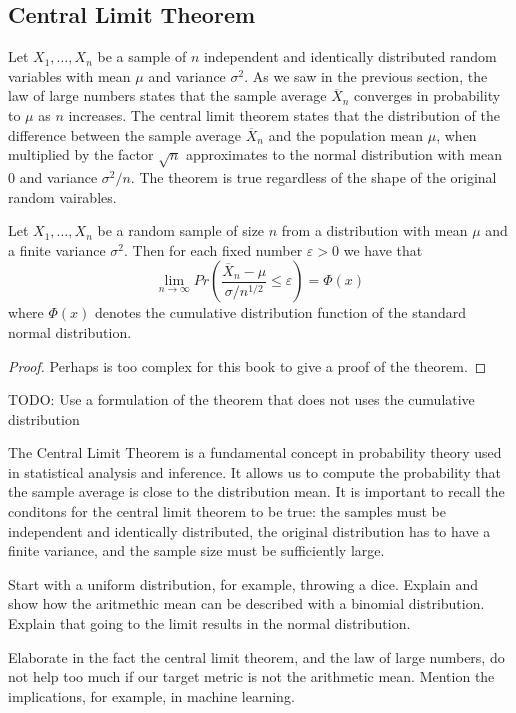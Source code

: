 
\subsection{Central Limit Theorem}

Let $X_1, \ldots, X_n$ be a sample of $n$ independent and identically distributed random variables with mean $\mu$ and variance $\sigma^2$. As we saw in the previous section, the law of large numbers states that the sample average $\overline {X}_n$ converges in probability to $\mu$ as $n$ increases. The central limit theorem states that the distribution of the difference between the sample average $\overline {X}_n$ and the population mean $\mu$, when multiplied by the factor $\sqrt {n}$ approximates to the normal distribution with mean $0$ and variance $\sigma^2 / n$. The theorem is true regardless of the shape of the original random vairables.

\begin{theorem}
Let $X_{1}, \ldots, X_{n}$ be a random sample of size $n$ from a distribution with mean $\mu$ and a finite variance $\sigma^{2}$. Then  for each fixed number $\varepsilon > 0$ we have that
\[
\lim_{n \rightarrow \infty} Pr \left( \frac{\overline{X}_{n}-\mu}{\sigma/n^{1/2}} \leq \varepsilon \right) = \Phi \left( x \right)
\]
where $\Phi \left( x \right)$ denotes the cumulative distribution function of the standard normal distribution.
\end{theorem}
\begin{proof}
{\color{red} Perhaps is too complex for this book to give a proof of the theorem.}
\end{proof}

{\color{red} TODO: Use a formulation of the theorem that does not uses the cumulative distribution}

The Central Limit Theorem is a fundamental concept in probability theory used in statistical analysis and inference. It allows us to compute the probability that the sample average is close to the distribution mean. It is important to recall the conditons for the central limit theorem to be true: the samples must be independent and identically distributed, the original distribution has to have a finite variance, and the sample size must be sufficiently large.

\begin{example}
{\color{red} Start with a uniform distribution, for example, throwing a dice. Explain and show how the aritmethic mean can be described with a binomial distribution. Explain that going to the limit results in the normal distribution.}
\end{example}

{\color{red} Elaborate in the fact the central limit theorem, and the law of large numbers, do not help too much if our target metric is not the arithmetic mean. Mention the implications, for example, in machine learning.}
